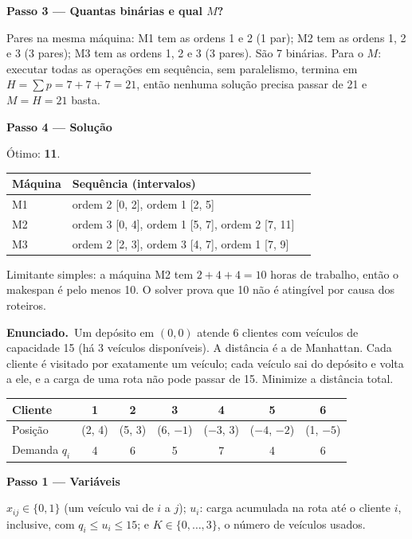 \documentclass[11pt,a4paper]{article}
\newcommand{\enunciado}{\par\textbf{Enunciado.}\ }
\newcommand{\passo}[1]{\par\medskip\textbf{#1}\par}
\begin{document}
\passo{Passo 3 --- Quantas binárias e qual $M$?}
Pares na mesma máquina: M1 tem as ordens 1 e 2 (1 par); M2 tem as ordens 1, 2 e 3 (3 pares); M3 tem as ordens 1, 2 e 3 (3 pares).
São 7 binárias. Para o $M$: executar todas as operações em sequência, sem paralelismo, termina em
$H=\sum p=7+7+7=21$, então nenhuma solução precisa passar de 21 e $M=H=21$ basta.

\passo{Passo 4 --- Solução}
Ótimo: \textbf{11}.
\begin{center}
\begin{tabular}{lll}
\toprule
Máquina & Sequência (intervalos) & \\
\midrule
M1 & ordem 2 [0, 2], ordem 1 [2, 5] & \\
M2 & ordem 3 [0, 4], ordem 1 [5, 7], ordem 2 [7, 11] & \\
M3 & ordem 2 [2, 3], ordem 3 [4, 7], ordem 1 [7, 9] & \\
\bottomrule
\end{tabular}
\end{center}
Limitante simples: a máquina M2 tem $2+4+4=10$ horas de trabalho, então o makespan é pelo menos 10. O solver prova que
10 não é atingível por causa dos roteiros.

\enunciado Um depósito em $(0,0)$ atende 6 clientes com veículos de capacidade 15 (há 3 veículos disponíveis). A distância
é a de Manhattan. Cada cliente é visitado por exatamente um veículo; cada veículo sai do depósito e volta a ele, e a carga
de uma rota não pode passar de 15. Minimize a distância total.
\begin{center}
\begin{tabular}{lcccccc}
\toprule
Cliente & 1 & 2 & 3 & 4 & 5 & 6\\
\midrule
Posição & (2, 4) & (5, 3) & (6, $-1$) & ($-3$, 3) & ($-4$, $-2$) & (1, $-5$)\\
Demanda $q_i$ & 4 & 6 & 5 & 7 & 4 & 6\\
\bottomrule
\end{tabular}
\end{center}

\passo{Passo 1 --- Variáveis}
$x_{ij}\in\{0,1\}$ (um veículo vai de $i$ a $j$); $u_i$: carga acumulada na rota até o cliente $i$, inclusive, com
$q_i\le u_i\le15$; e $K\in\{0,\dots,3\}$, o número de veículos usados.
\end{document}
